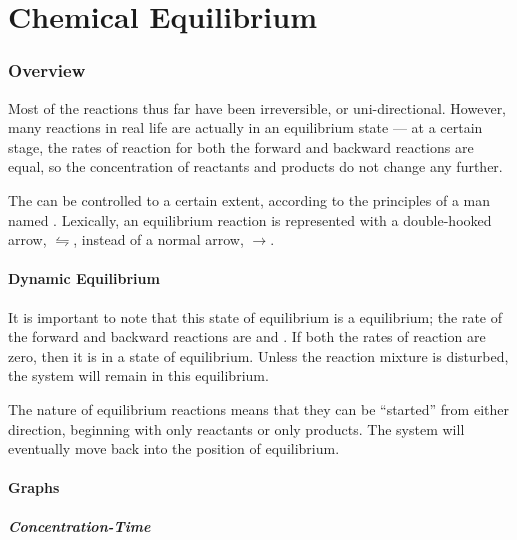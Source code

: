 

\pagebreak
\part{Chemical Equilibrium}

	\section{Overview}

		Most of the reactions thus far have been irreversible, or uni-directional. However, many reactions in real life are actually in an
		equilibrium state --- at a certain stage, the rates of reaction for both the forward and backward reactions are equal, so the
		concentration of reactants and products do not change any further.

		The  can be controlled to a certain extent, according to the principles of a man named
		. Lexically, an equilibrium reaction is represented with a double-hooked arrow, $⇋$, instead of a normal
		arrow, $→$.

		\subsection{Dynamic Equilibrium}

			It is important to note that this state of equilibrium is a  equilibrium; the rate of the forward and backward
			reactions are  and . If both the rates of reaction are zero, then it is in a state of 
			equilibrium. Unless the reaction mixture is disturbed, the system will remain in this equilibrium.

			The nature of equilibrium reactions means that they can be \enquote{started} from either direction, beginning with only reactants or
			only products. The system will eventually move back into the position of equilibrium.


		\pagebreak
		\subsection{Graphs}

			\subsubsection{Concentration-Time}

